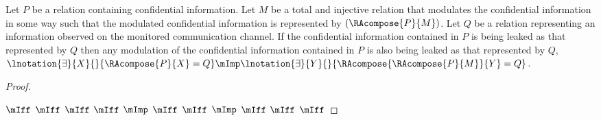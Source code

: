 \begin{corollary}
\label{cor:modulate}
	Let $P$ be a relation containing confidential information. Let $M$ be a total and injective relation that modulates the confidential information in some way such that the modulated confidential information is represented by $(\RAcompose{P}{M})$. Let $Q$ be a relation representing an information observed on the monitored communication channel. If the confidential information contained in $P$ is being leaked as that represented by $Q$ then any modulation of the confidential information contained in $P$ is also being leaked as that represented by $Q$, \ie $\lnotation{\exists}{X}{}{\RAcompose{P}{X} = Q} \mImp \lnotation{\exists}{Y}{}{\RAcompose{\RAcompose{P}{M}}{Y} = Q}$. \newline
	
	\begin{proof}~

		\Beginproof 
			$\mIff$ 
			$\mIff$ 
			$\mIff$ 
			$\mIff$ 
			$\mImp$ 
			$\mIff$ 
			$\mIff$ 
			$\mImp$ 
			$\mIff$ 
			$\mIff$ 
			$\mIff$ 
		\Endproof


\end{proof}
\end{corollary}
